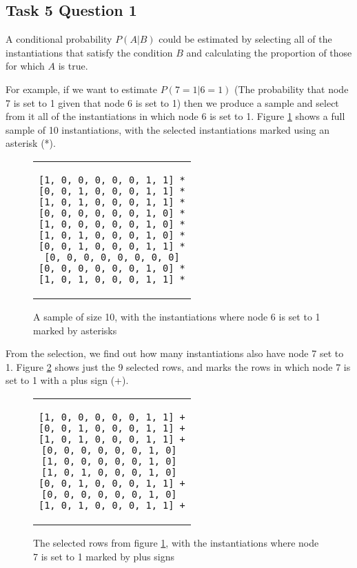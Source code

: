 \documentclass[a4paper,11pt]{article}
\begin{document}
\subsection{Task 5 Question 1}

A conditional probability $P(A|B)$ could be estimated by selecting all of the instantiations that satisfy the condition $B$ and calculating the proportion of those for which $A$ is true.

For example, if we want to estimate $P(7=1|6=1)$ (The probability that node 7 is set to 1 given that node 6 is set to 1) then we produce a sample and select from it all of the instantiations in which node 6 is set to 1.  Figure \ref{sample1} shows a full sample of 10 instantiations, with the selected instantiations marked using an asterisk (*).

\begin{figure}[h]
	\centering
	\lstset{basicstyle=\ttfamily}
	\begin{tabular}{c}
	\begin{lstlisting}
[1, 0, 0, 0, 0, 0, 1, 1] *
[0, 0, 1, 0, 0, 0, 1, 1] *
[1, 0, 1, 0, 0, 0, 1, 1] *
[0, 0, 0, 0, 0, 0, 1, 0] *
[1, 0, 0, 0, 0, 0, 1, 0] *
[1, 0, 1, 0, 0, 0, 1, 0] *
[0, 0, 1, 0, 0, 0, 1, 1] *
[0, 0, 0, 0, 0, 0, 0, 0]
[0, 0, 0, 0, 0, 0, 1, 0] *
[1, 0, 1, 0, 0, 0, 1, 1] *
	\end{lstlisting}
	\end{tabular}
	\caption{A sample of size 10, with the instantiations where node 6 is set to 1 marked by asterisks}
	\label{sample1}
\end{figure}

From the selection, we find out how many instantiations also have node 7 set to 1. Figure \ref{sample2} shows just the 9 selected rows, and marks the rows in which node 7 is set to 1 with a plus sign (+).

\begin{figure}[h]
	\centering
	\lstset{basicstyle=\ttfamily}
	\begin{tabular}{c}
	\begin{lstlisting}
[1, 0, 0, 0, 0, 0, 1, 1] +
[0, 0, 1, 0, 0, 0, 1, 1] +
[1, 0, 1, 0, 0, 0, 1, 1] +
[0, 0, 0, 0, 0, 0, 1, 0] 
[1, 0, 0, 0, 0, 0, 1, 0] 
[1, 0, 1, 0, 0, 0, 1, 0] 
[0, 0, 1, 0, 0, 0, 1, 1] +
[0, 0, 0, 0, 0, 0, 1, 0] 
[1, 0, 1, 0, 0, 0, 1, 1] +
	\end{lstlisting}
	\end{tabular}
	\caption{The selected rows from figure \ref{sample1}, with the instantiations where node 7 is set to 1 marked by plus signs}
	\label{sample2}
\end{figure}
\end{document}
